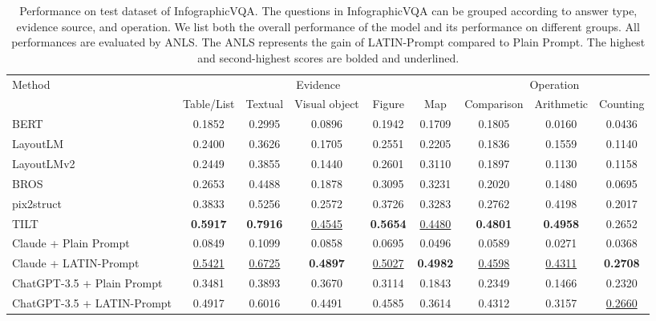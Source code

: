 \documentclass[letterpaper]{article} \usepackage{aaai24_preprint}  \usepackage{times}  \usepackage{helvet}  \usepackage{courier}  \usepackage[hyphens]{url}  \usepackage{graphicx} \urlstyle{rm} \def\UrlFont{\rm}  \usepackage{natbib}  \usepackage{caption} \frenchspacing  \setlength{\pdfpagewidth}{8.5in} \setlength{\pdfpageheight}{11in} \usepackage{algorithm}
\begin{document}
\begin{table*}[t]
\begin{tabular}{@{}l|ccccc|ccc@{}}
\toprule
\multirow{2}{*}{Method} & \multicolumn{5}{c|}{Evidence}                                                           & \multicolumn{3}{c}{Operation}                       \\
& Table/List      & Textual         & Visual object   & Figure          & Map             & Comparison      & Arithmetic      & Counting        \\ \midrule
BERT                    & 0.1852          & 0.2995          & 0.0896          & 0.1942          & 0.1709          & 0.1805          & 0.0160          & 0.0436          \\
LayoutLM          & 0.2400          & 0.3626          & 0.1705          & 0.2551          & 0.2205          & 0.1836          & 0.1559          & 0.1140          \\
LayoutLMv2              & 0.2449          & 0.3855          & 0.1440          & 0.2601          & 0.3110          & 0.1897          & 0.1130          & 0.1158          \\
BROS                    & 0.2653          & 0.4488          & 0.1878          & 0.3095          & 0.3231          & 0.2020          & 0.1480          & 0.0695          \\
pix2struct              & 0.3833          & 0.5256          & 0.2572          & 0.3726          & 0.3283          & 0.2762          & 0.4198          & 0.2017          \\
TILT& \textbf{0.5917} & \textbf{0.7916} & \underline{0.4545}    & \textbf{0.5654} & \underline{0.4480}    & \textbf{0.4801} & \textbf{0.4958} & 0.2652          \\ \midrule
Claude + Plain Prompt   & 0.0849          & 0.1099          & 0.0858          & 0.0695          & 0.0496          & 0.0589          & 0.0271          & 0.0368          \\
Claude + LATIN-Prompt   & \underline{0.5421}    & \underline{0.6725}    & \textbf{0.4897} & \underline{0.5027}    & \textbf{0.4982} & \underline{0.4598}    & \underline{0.4311}    & \textbf{0.2708} \\ \cmidrule(l){1-9} 
ChatGPT-3.5 + Plain Prompt  & 0.3481          & 0.3893          & 0.3670          & 0.3114          & 0.1843          & 0.2349          & 0.1466          & 0.2320          \\
ChatGPT-3.5 + LATIN-Prompt  & 0.4917          & 0.6016          & 0.4491          & 0.4585          & 0.3614          & 0.4312          & 0.3157          & \underline{0.2660}    \\ \bottomrule
\end{tabular}
\caption{
Performance on test dataset of InfographicVQA.
The questions in InfographicVQA can be grouped according to answer type, evidence source, and operation.
We list both the overall performance of the model and its performance on different groups.
All performances are evaluated by ANLS.
The ANLS represents the gain of LATIN-Prompt compared to Plain Prompt.
The highest and second-highest scores are bolded and underlined.
}
\label{tab:exp_infographicvqa}
\end{table*}
\end{document}
